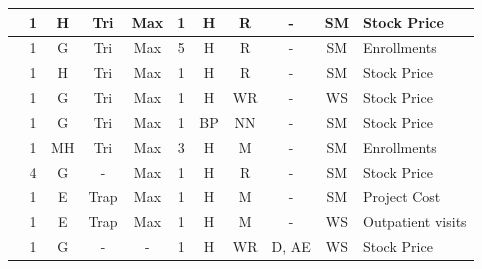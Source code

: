 \begin{center}
\begin{landscape}
\begin{longtable}[c]{|m{4cm}|c|c|c|c|c|c|c|c|c|m{5cm}|}
\cite{huarng2001effective} & 1                  & H             & Tri  & Max                & 1              & H                       & R               & -                        & SM              & Stock Price           \\ \hline
\cite{Chen2002}            & 1                  & G                  & Tri  & Max                & 5              & H                       & R              & -                        & SM              & Enrollments           \\ \hline
\cite{Huarng2004}          & 1                  & H             & Tri  & Max                & 1              & H                       & R               & -                        & SM              & Stock Price           \\ \hline
\cite{yu2005weighted}              & 1                  & G                  & Tri  & Max                & 1              & H                       & WR      & -                        & WS            & Stock Price           \\ \hline
\cite{Huarng2006}          & 1                  & G                  & Tri  & Max                & 1              & BP                              & NN                 & -                        & SM              & Stock Price           \\ \hline
\cite{Chen2006a}           & 1                  & MH         & Tri  & Max                & 3              & H                       & M              & -                        & SM              & Enrollments           \\ \hline
\cite{Lee2006}             & 4                  & G                  & -           & Max                & 1              & H                       & R               & -                        & SM              & Stock Price           \\ \hline
\cite{Cheng2006a}          & 1                  & E               & Trap & Max                & 1              & H                       & M              & -                        & SM              & Project Cost          \\ \hline
\cite{Cheng2008a}          & 1                  & E               & Trap & Max                & 1              & H                       & M              & -                        & WS            & Outpatient visits     \\ \hline
\cite{Cheng2008}           & 1                  & G                  & -           & -                      & 1              & H                       & WR      & D, AE           & WS            & Stock Price           \\ \hline

\end{longtable}
\end{landscape}
\end{center}
